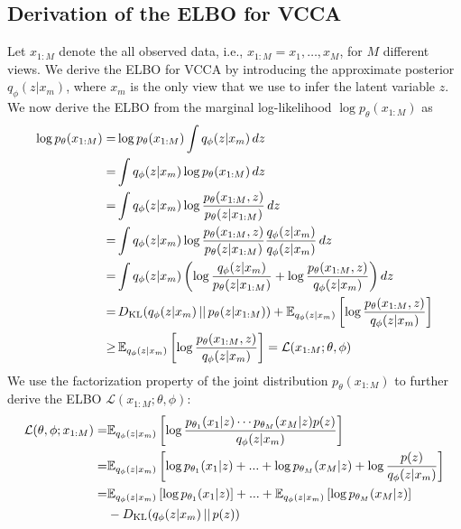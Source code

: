 
\subsection{Derivation of the ELBO for VCCA}
\label{paperB:app:derivation_of_elbo_for_vcca}

Let $x_{1:M}$ denote the all observed data, i.e., $x_{1:M} = x_1, \dots, x_M$, for $M$ different views. We derive the ELBO for VCCA by introducing the approximate posterior $q_{\phi}(z | x_m)$, where $x_m$ is the only view that we use to infer the latent variable $z$. We now derive the ELBO from the marginal log-likelihood $ \log p_{{\theta}}(x_{1:M})$ as 
\begin{align*}
    \begin{split}
        \log p_{{\theta}}(x_{1:M}) = & \log p_{{\theta}}(x_{1:M}) \int q_{\phi}(z | x_m) \, dz \\
        = & \int q_{\phi}(z | x_m) \log p_{{\theta}}(x_{1:M}) \, dz \\
        = & \int q_{\phi}(z | x_m) \log \frac{p_{{\theta}}(x_{1:M}, z)}{p_{{\theta}}(z | x_{1:M})}  \, dz \\
        = & \int q_{\phi}(z | x_m) \log \frac{p_{{\theta}}(x_{1:M}, z)}{p_{{\theta}}(z | x_{1:M})} \frac{q_{\phi}(z | x_m)}{q_{\phi}(z | x_m)}  \, dz \\
        = & \int q_{\phi}(z | x_m) \left( \log \frac{q_{\phi}(z | x_m)}{p_{{\theta}}(z | x_{1:M})} + \log \frac{p_{{\theta}}(x_{1:M}, z)}{q_{\phi}(z | x_m)} \right) dz \\
        = & \, D_{\mathrm{KL}}(q_{\phi}(z | x_m) \,||\, p_{{\theta}}(z | x_{1:M})) + \mathbb{E}_{q_{\phi}(z | x_m)}\left[ \log \frac{p_{{\theta}}(x_{1:M}, z)}{q_{\phi}(z | x_m)} \right] \\
        \geq & \, \mathbb{E}_{q_{\phi}(z | x_m)}\left[ \log \frac{p_{{\theta}}(x_{1:M}, z)}{q_{\phi}(z | x_m)} \right] = \mathcal{L}(x_{1:M}; \theta, \phi)
    \end{split}
\end{align*}
We use the factorization property of the joint distribution $p_{\theta}(x_{1:M})$ to further derive the ELBO $\mathcal{L}(x_{1:M}; \theta, \phi)$:
\begin{align*}
    \begin{split}
        \mathcal{L}(\theta, \phi; x_{1:M}) = & \mathbb{E}_{q_{\phi}(z | x_m)}\left[ \log \frac{p_{{\theta}_1}(x_1 |  z) \cdots p_{{\theta}_M}(x_M |  z) p(z)}{q_{\phi}(z | x_m)} \right] \\
        = & \mathbb{E}_{q_{\phi}(z | x_m)}\left[ \log p_{{\theta}_1}(x_1 |  z) + ... + \log p_{{\theta}_M}(x_M |  z) + \log \frac{p(z)}{q_{\phi}(z | x_m)} \right] \\
        = & \mathbb{E}_{q_{\phi}(z | x_m)}\left[ \log p_{{\theta}_1}(x_1 |  z) \right] + ... + \mathbb{E}_{q_{\phi}(z | x_m)}\left[ \log p_{{\theta}_M}(x_M |  z) \right] \\ 
        & -D_{\mathrm{KL}}(q_{\phi}(z | x_m) \,||\, p(z))
    \end{split}
\end{align*}
